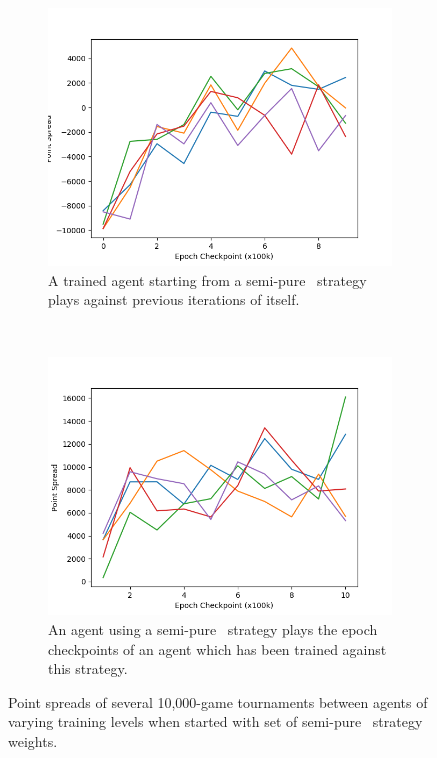 
\begin{figure}
\center


\begin{subfigure}[t]{0.45\textwidth}
	\includegraphics[width=\linewidth]{images/findings/experiments/starting_points/tourny_a.png}
	\caption{
		A trained agent starting from a semi-pure \handmaxavg\ strategy
		plays against previous iterations of itself.
	}
	\label{fig:expts-sanitycheck-spreads-a}
\end{subfigure}
~
\begin{subfigure}[t]{0.45\textwidth}
	\includegraphics[width=\linewidth]{images/findings/experiments/starting_points/tourny_b.png}
	\caption{
		An agent using a semi-pure \handmaxavg\ strategy
		plays the epoch checkpoints of an agent which has been trained
		against this strategy.
	}
	\label{fig:expts-sanitycheck-spreads-b}
\end{subfigure}

\caption{
	Point spreads of several 10,000-game tournaments
	between agents of varying training levels
	when started with set of semi-pure \handmaxavg\ strategy weights.
}
\label{fig:expts-sanitycheck-spreads}
\end{figure}
